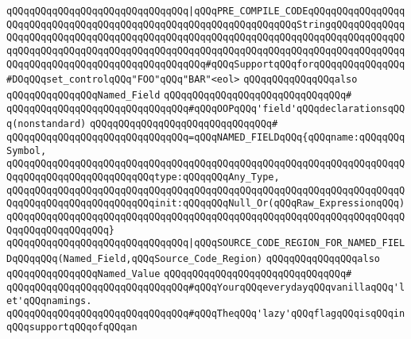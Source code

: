 \newline
\verb|qQQqqQQqqQQqqQQqqQQqqQQqqQQqqQQq|\verb#|qQQqPRE_COMPILE_CODEqQQqqQQqqQQqqQQqqQQqqQQqqQQqqQQqqQQqqQQqqQQqqQQqqQQqqQQqqQQqqQQqqQQqStringqQQqqQQqqQQqqQQqqQQqqQQqqQQqqQQqqQQqqQQqqQQqqQQqqQQqqQQqqQQqqQQqqQQqqQQqqQQqqQQqqQQqqQQqqQQqqQQqqQQqqQQqqQQqqQQqqQQqqQQqqQQqqQQqqQQqqQQqqQQqqQQqqQQqqQQqqQQqqQQqqQQqqQQqqQQqqQQqqQQqqQQqqQQq#\verb|#qQQqSupportqQQqforqQQqqQQqqQQqqQQq#DOqQQqset_controlqQQq"FOO"qQQq"BAR"<eol>|\newline
\newline
\newline
\verb|qQQqqQQqqQQqqQQqalso|\newline
\verb|qQQqqQQqqQQqqQQqNamed_Field|\newline
\verb|qQQqqQQqqQQqqQQqqQQqqQQqqQQqqQQq#|\newline
\verb|qQQqqQQqqQQqqQQqqQQqqQQqqQQqqQQq#qQQqOOPqQQq'field'qQQqdeclarationsqQQq(nonstandard)|\newline
\verb|qQQqqQQqqQQqqQQqqQQqqQQqqQQqqQQq#|\newline
\verb|qQQqqQQqqQQqqQQqqQQqqQQqqQQqqQQq=qQQqNAMED_FIELDqQQq{qQQqname:qQQqqQQqSymbol,|\newline
\verb|qQQqqQQqqQQqqQQqqQQqqQQqqQQqqQQqqQQqqQQqqQQqqQQqqQQqqQQqqQQqqQQqqQQqqQQqqQQqqQQqqQQqqQQqqQQqqQQqtype:qQQqqQQqAny_Type,|\newline
\verb|qQQqqQQqqQQqqQQqqQQqqQQqqQQqqQQqqQQqqQQqqQQqqQQqqQQqqQQqqQQqqQQqqQQqqQQqqQQqqQQqqQQqqQQqqQQqqQQqinit:qQQqqQQqNull_Or(qQQqRaw_ExpressionqQQq)|\newline
\verb|qQQqqQQqqQQqqQQqqQQqqQQqqQQqqQQqqQQqqQQqqQQqqQQqqQQqqQQqqQQqqQQqqQQqqQQqqQQqqQQqqQQqqQQq}|\newline
\newline
\verb|qQQqqQQqqQQqqQQqqQQqqQQqqQQqqQQq|\verb#|qQQqSOURCE_CODE_REGION_FOR_NAMED_FIELDqQQqqQQq(Named_Field,qQQqSource_Code_Region)#\newline
\newline
\newline
\newline
\verb|qQQqqQQqqQQqqQQqalso|\newline
\verb|qQQqqQQqqQQqqQQqNamed_Value|\newline
\verb|qQQqqQQqqQQqqQQqqQQqqQQqqQQqqQQq#|\newline
\verb|qQQqqQQqqQQqqQQqqQQqqQQqqQQqqQQq#qQQqYourqQQqeverydayqQQqvanillaqQQq'let'qQQqnamings.|\newline
\verb|qQQqqQQqqQQqqQQqqQQqqQQqqQQqqQQq#qQQqTheqQQq'lazy'qQQqflagqQQqisqQQqinqQQqsupportqQQqofqQQqan|\newline
